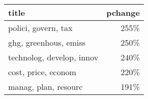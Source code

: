 \begin{tabular}{lr}
\toprule
                     title &  pchange \\
\midrule
       polici, govern, tax &     255\% \\
     ghg, greenhous, emiss &     250\% \\
 technolog, develop, innov &     240\% \\
       cost, price, econom &     220\% \\
      manag, plan, resourc &     191\% \\
\bottomrule
\end{tabular}
